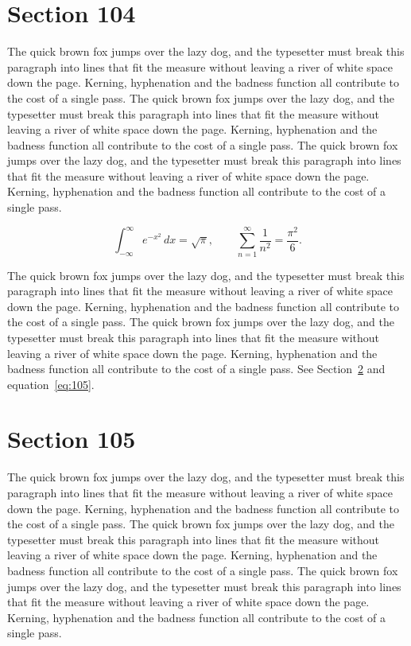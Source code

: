 \documentclass{article}
\begin{document}
\section{Section 104}
\label{sec:104}
The quick brown fox jumps over the lazy dog, and the typesetter must break this paragraph into lines that fit the measure without leaving a river of white space down the page. Kerning, hyphenation and the badness function all contribute to the cost of a single pass. The quick brown fox jumps over the lazy dog, and the typesetter must break this paragraph into lines that fit the measure without leaving a river of white space down the page. Kerning, hyphenation and the badness function all contribute to the cost of a single pass. The quick brown fox jumps over the lazy dog, and the typesetter must break this paragraph into lines that fit the measure without leaving a river of white space down the page. Kerning, hyphenation and the badness function all contribute to the cost of a single pass. 

\begin{equation}\label{eq:104}
\int_{-\infty}^{\infty} e^{-x^{2}}\,dx = \sqrt{\pi}, \qquad
\sum_{n=1}^{\infty} \frac{1}{n^{2}} = \frac{\pi^{2}}{6}.
\end{equation}

The quick brown fox jumps over the lazy dog, and the typesetter must break this paragraph into lines that fit the measure without leaving a river of white space down the page. Kerning, hyphenation and the badness function all contribute to the cost of a single pass. The quick brown fox jumps over the lazy dog, and the typesetter must break this paragraph into lines that fit the measure without leaving a river of white space down the page. Kerning, hyphenation and the badness function all contribute to the cost of a single pass. 
See Section~\ref{sec:105} and equation~\eqref{eq:105}.
\section{Section 105}
\label{sec:105}
The quick brown fox jumps over the lazy dog, and the typesetter must break this paragraph into lines that fit the measure without leaving a river of white space down the page. Kerning, hyphenation and the badness function all contribute to the cost of a single pass. The quick brown fox jumps over the lazy dog, and the typesetter must break this paragraph into lines that fit the measure without leaving a river of white space down the page. Kerning, hyphenation and the badness function all contribute to the cost of a single pass. The quick brown fox jumps over the lazy dog, and the typesetter must break this paragraph into lines that fit the measure without leaving a river of white space down the page. Kerning, hyphenation and the badness function all contribute to the cost of a single pass. 
\end{document}
